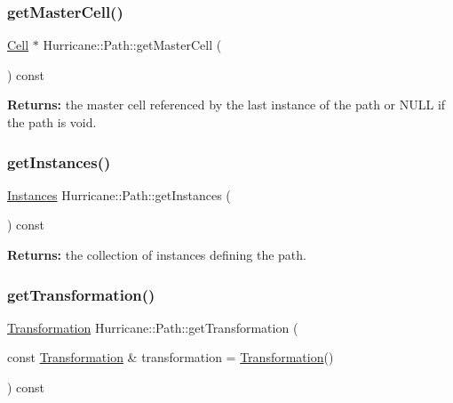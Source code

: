 \subsubsection{\texorpdfstring{get\+Master\+Cell()}{getMasterCell()}}
{\footnotesize\ttfamily \mbox{\hyperlink{classHurricane_1_1Cell}{Cell}} $\ast$ Hurricane\+::\+Path\+::get\+Master\+Cell (\begin{DoxyParamCaption}{ }\end{DoxyParamCaption}) const}

{\bfseries Returns\+:} the master cell referenced by the last instance of the path or N\+U\+LL if the path is void. \mbox{\label{classHurricane_1_1Path_af820422a686ab35d611a6c1969e37e90}} 
\subsubsection{\texorpdfstring{get\+Instances()}{getInstances()}}
{\footnotesize\ttfamily \mbox{\hyperlink{namespaceHurricane_ac9436b03a2926f34ad6863deae2baadc}{Instances}} Hurricane\+::\+Path\+::get\+Instances (\begin{DoxyParamCaption}{ }\end{DoxyParamCaption}) const}

{\bfseries Returns\+:} the collection of instances defining the path. \mbox{\label{classHurricane_1_1Path_af48dc47810f65e7aba6ee8f24ed8a09e}} 
\subsubsection{\texorpdfstring{get\+Transformation()}{getTransformation()}}
{\footnotesize\ttfamily \mbox{\hyperlink{classHurricane_1_1Transformation}{Transformation}} Hurricane\+::\+Path\+::get\+Transformation (\begin{DoxyParamCaption}\item[{const \mbox{\hyperlink{classHurricane_1_1Transformation}{Transformation}} \&}]{transformation = {\ttfamily \mbox{\hyperlink{classHurricane_1_1Transformation}{Transformation}}()} }\end{DoxyParamCaption}) const}


